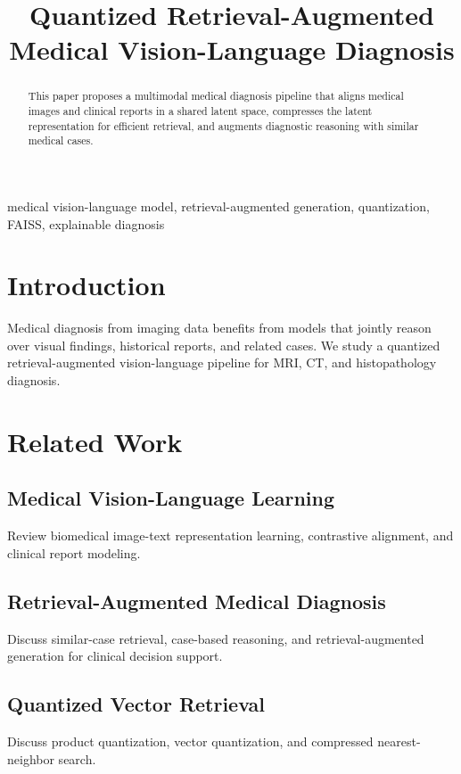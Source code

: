 \documentclass[conference]{IEEEtran}
\title{Quantized Retrieval-Augmented Medical Vision-Language Diagnosis}
\author{
  \IEEEauthorblockN{Author Name}
  \IEEEauthorblockA{Institution\\Email}
}
\begin{document}
\maketitle

\begin{abstract}
This paper proposes a multimodal medical diagnosis pipeline that aligns medical images and clinical reports in a shared latent space, compresses the latent representation for efficient retrieval, and augments diagnostic reasoning with similar medical cases.
\end{abstract}

\begin{IEEEkeywords}
medical vision-language model, retrieval-augmented generation, quantization, FAISS, explainable diagnosis
\end{IEEEkeywords}

\section{Introduction}
Medical diagnosis from imaging data benefits from models that jointly reason over visual findings, historical reports, and related cases. We study a quantized retrieval-augmented vision-language pipeline for MRI, CT, and histopathology diagnosis.

\section{Related Work}
\subsection{Medical Vision-Language Learning}
Review biomedical image-text representation learning, contrastive alignment, and clinical report modeling.

\subsection{Retrieval-Augmented Medical Diagnosis}
Discuss similar-case retrieval, case-based reasoning, and retrieval-augmented generation for clinical decision support.

\subsection{Quantized Vector Retrieval}
Discuss product quantization, vector quantization, and compressed nearest-neighbor search.
\end{document}
